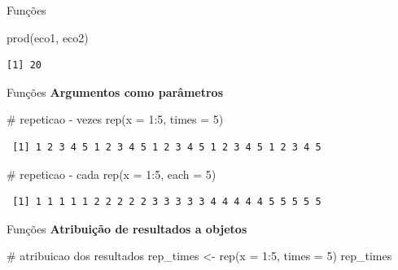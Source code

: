 \documentclass[
  ignorenonframetext,
]{beamer}
\newenvironment{Shaded}{\begin{snugshade}}{\end{snugshade}}
\newcommand{\AttributeTok}[1]{\textcolor[rgb]{0.40,0.45,0.13}{#1}}
\newcommand{\CommentTok}[1]{\textcolor[rgb]{0.37,0.37,0.37}{#1}}
\newcommand{\DecValTok}[1]{\textcolor[rgb]{0.68,0.00,0.00}{#1}}
\newcommand{\FunctionTok}[1]{\textcolor[rgb]{0.28,0.35,0.67}{#1}}
\newcommand{\NormalTok}[1]{\textcolor[rgb]{0.00,0.23,0.31}{#1}}
\newcommand{\OtherTok}[1]{\textcolor[rgb]{0.00,0.23,0.31}{#1}}
\newcommand{\SpecialCharTok}[1]{\textcolor[rgb]{0.37,0.37,0.37}{#1}}
\begin{document}
\begin{frame}[fragile]
\begin{block}{Funções}
\begin{Shaded}
\begin{Highlighting}[]
\FunctionTok{prod}\NormalTok{(eco1, eco2)}
\end{Highlighting}
\end{Shaded}

\begin{verbatim}
[1] 20
\end{verbatim}
\end{block}

\begin{block}{Funções}
\protect\hypertarget{funuxe7uxf5es-4}{}
\textbf{Argumentos como parâmetros}

\begin{Shaded}
\begin{Highlighting}[]
\CommentTok{\# repeticao {-} vezes}
\FunctionTok{rep}\NormalTok{(}\AttributeTok{x =} \DecValTok{1}\SpecialCharTok{:}\DecValTok{5}\NormalTok{, }\AttributeTok{times =} \DecValTok{5}\NormalTok{)}
\end{Highlighting}
\end{Shaded}

\begin{verbatim}
 [1] 1 2 3 4 5 1 2 3 4 5 1 2 3 4 5 1 2 3 4 5 1 2 3 4 5
\end{verbatim}

\pause

\begin{Shaded}
\begin{Highlighting}[]
\CommentTok{\# repeticao {-} cada}
\FunctionTok{rep}\NormalTok{(}\AttributeTok{x =} \DecValTok{1}\SpecialCharTok{:}\DecValTok{5}\NormalTok{, }\AttributeTok{each =} \DecValTok{5}\NormalTok{)}
\end{Highlighting}
\end{Shaded}

\begin{verbatim}
 [1] 1 1 1 1 1 2 2 2 2 2 3 3 3 3 3 4 4 4 4 4 5 5 5 5 5
\end{verbatim}
\end{block}

\begin{block}{Funções}
\protect\hypertarget{funuxe7uxf5es-5}{}
\textbf{Atribuição de resultados a objetos}

\begin{Shaded}
\begin{Highlighting}[]
\CommentTok{\# atribuicao dos resultados}
\NormalTok{rep\_times }\OtherTok{\textless{}{-}} \FunctionTok{rep}\NormalTok{(}\AttributeTok{x =} \DecValTok{1}\SpecialCharTok{:}\DecValTok{5}\NormalTok{, }\AttributeTok{times =} \DecValTok{5}\NormalTok{)}
\NormalTok{rep\_times}
\end{Highlighting}
\end{Shaded}


\end{block}
\end{frame}
\end{document}
